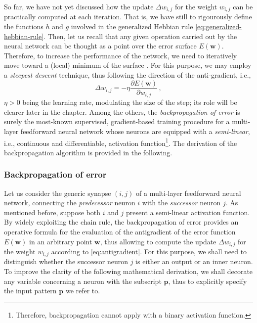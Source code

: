 \documentclass[12pt, a4paper, twoside, openright]{report}
\numberwithin{equation}{chapter}
\theoremstyle{theorem}
\theoremstyle{definition}
\theoremstyle{remark}
\theoremstyle{proposition}
\numberwithin{figure}{chapter}
\begin{document}
		So far, we have not yet discussed how the update $\Delta w_{i,j}$ for the weight $w_{i,j}$ can be practically computed at each iteration. That is, we have still to rigourously define the functions $h$ and $g$ involved in the generalized Hebbian rule \eqref{eq:generalized-hebbian-rule}. Then, let us recall that any given operation carried out by the neural network can be thought as a point over the error surface $E(\mathbf{w})$. Therefore, to increase the performance of the network, we need to iteratively move toward a (local) minimum of the surface \cite{Hay05}. For this purpose, we may employ a \emph{steepest descent} technique, thus following the direction of the anti-gradient, i.e.,
		\begin{equation}
			\label{eq:antigradient}
			\Delta w_{i,j} = - \eta \dfrac{\partial E(\mathbf{w})}{\partial w_{i,j}} \, ,
		\end{equation}
		$\eta > 0$ being the learning rate, modulating the size of the step; its role will be clearer later in the chapter. Among the others, the \emph{backpropagation of error} \cite{MR86} is surely the most-known supervised, gradient-based training procedure for a multi-layer feedforward neural network whose neurons are equipped with a \emph{semi-linear}, i.e., continuous and differentiable, activation function\footnote{Therefore, backpropagation cannot apply with a binary activation function.}. The derivation of the backpropagation algorithm is provided in the following.
		
	\subsubsection{Backpropagation of error}
	\label{section:Backpropagation of error}
		
		Let us consider the generic synapse $(i,j)$ of a multi-layer feedforward neural network, connecting the \emph{predecessor} neuron $i$ with the \emph{successor} neuron $j$. As mentioned before, suppose both $i$ and $j$ present a semi-linear activation function. By widely exploiting the chain rule, the backpropagation of error provides an operative formula for the evaluation of the antigradient of the error function $E(\mathbf{w})$ in an arbitrary point $\mathbf{w}$, thus allowing to compute the update $\Delta w_{i,j}$ for the weight $w_{i,j}$ according to \eqref{eq:antigradient}. For this purpose, we shall need to distinguish whether the successor neuron $j$ is either an output or an inner neuron. To improve the clarity of the following mathematical derivation, we shall decorate any variable concerning a neuron with the subscript $\mathbf{p}$, thus to explicitly specify the input pattern $\mathbf{p}$ we refer to.
		
\end{document}
